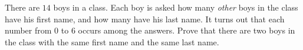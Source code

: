 There are $14$ boys in a class. Each boy is asked how many \emph{other} boys in the class have his first name, and how many have his last name. It turns out that each number from $0$ to $6$ occurs among the answers. Prove that there are two boys in the class with the same first name and the same last name.

